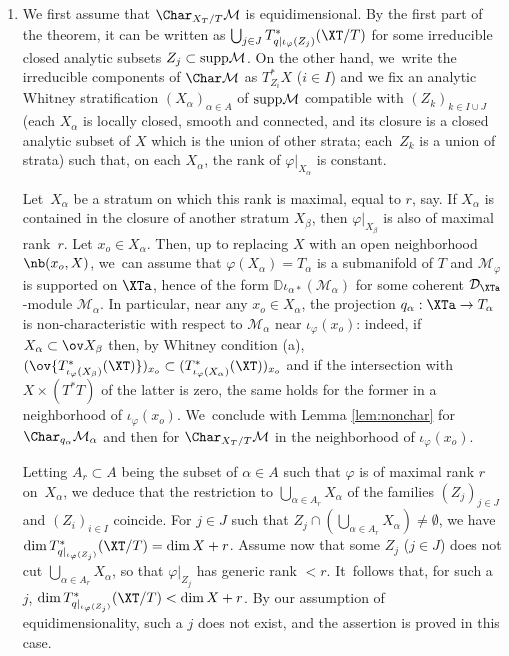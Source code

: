 \documentclass{amsart}
\theoremstyle{plain}
\numberwithin{theorem}{section}
\theoremstyle{definition}
\theoremstyle{remark}
\theoremstyle{definition}
\newcommand{\D}{\mathbb{D}}
\newcommand{\cD}{\mathcal{D}}
\newcommand{\cM}{\mathcal{M}}
\newcommand{\supp}{\textup{supp}}
\begin{document}
\begin{enumerate}
\item\label{par:detabsolute1}
We first assume that $\Char_{X_T/T}\cM$ is equidimensional. By the first part of the theorem, it can be written as $\bigcup_{j\in J}T^*_{q|\iota_\varphi(Z_j)}(\XT/T)$ for some irreducible closed analytic subsets $Z_j\subset\supp\cM$. On the other hand, we~write the irreducible components of $\Char\cM$ as $T^*_{Z_i}X$ ($i\in I$) and we fix an analytic Whitney stratification $(X_\alpha)_{\alpha\in A}$ of $\supp\cM$ compatible with $(Z_k)_{k\in I\cup J}$ (each $X_\alpha$ is locally closed, smooth and connected, and its closure is a closed analytic subset of $X$ which is the union of other strata; each~$Z_k$ is a union of strata) such that, on each $X_\alpha$, the rank of $\varphi|_{X_\alpha}$ is constant.

Let~$X_\alpha$ be a stratum on which this rank is maximal, equal to $r$, say. If $X_\alpha$ is contained in the closure of another stratum $X_\beta$, then $\varphi|_{X_\beta}$ is also of maximal rank~$r$.
Let $x_o\in X_\alpha$. Then, up to replacing $X$ with an open neighborhood $\nb(x_o,X)$, we~can assume that $\varphi(X_\alpha)=T_\alpha$ is a submanifold of $T$ and $\cM_\varphi$ is supported on $\XTa$, hence of the form $\D\iota_{\alpha*}(\cM_\alpha)$ for some coherent $\cD_{\XTa}$-module $\cM_\alpha$.  In particular, near any $x_o\in X_\alpha$, the projection $q_\alpha:\XTa\to T_\alpha$ is non-characteristic with respect to $\cM_\alpha$ near $\iota_\varphi(x_o)$: indeed, if $X_\alpha\subset \ov X_\beta$ then, by Whitney condition (a), $(\ov{T^*_{\iota_\varphi(X_\beta)}(\XT)})_{x_o}\subset (T^*_{\iota_\varphi(X_\alpha)}(\XT))_{x_o}$ and if the intersection with $X\times(T^*T)$ of the latter is zero, the same holds for the former in a neighborhood of $\iota_\varphi(x_o)$. We~conclude with Lemma \ref{lem:nonchar} for $\Char_{q_\alpha}\cM_\alpha$ and then for $\Char_{X_T/T}\cM$ in the neighborhood of $\iota_\varphi(x_o)$.

Letting $A_r\subset A$ being the subset of $\alpha\in A$ such that $\varphi$ is of maximal rank $r$ on~$X_\alpha$, we deduce that the restriction to $\bigcup_{\alpha\in A_r}X_\alpha$ of the families $(Z_j)_{j\in J}$ and $(Z_i)_{i\in I}$ coincide. For $j\in J$ such that $Z_j\cap (\bigcup_{\alpha\in A_r}X_\alpha)\neq\emptyset$, we have $\dim T^*_{q|_{\iota_\varphi(Z_j)}}(\XT/T)=\dim X+r$. Assume now that some $Z_j$ ($j\in J$) does not cut $\bigcup_{\alpha\in A_r}X_\alpha$, so that $\varphi|_{Z_j}$ has generic rank $<r$. It~follows that, for such a $j$, $\dim T^*_{q|_{\iota_\varphi(Z_j)}}(\XT/T)<\dim X+r$. By our assumption of equidimensionality, such a $j$ does not exist, and the assertion is proved in this case.


\end{enumerate}
\end{document}
